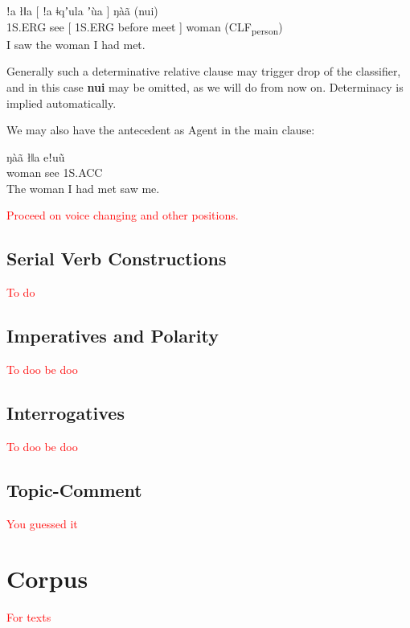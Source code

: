 \documentclass[11pt]{book}
\newcommand{\qcn}[1]{\textbf{#1}}
\newcommand{\grammsc}[1]{\textsc{#1}}
\newcommand{\CLF}[1]{\grammsc{CLF}\textsubscript{#1}}
\newcommand{\ERG}{\grammsc{ERG}}
\newcommand{\ACC}{\grammsc{ACC}}
\newcommand{\cmnt}[1]{\textcolor{red}{#1}}
\begin{document}
\begin{exe}
\ex
\gll ǃa łǁa [ ǃa ǂqʼula ʼùa ] ŋàã (nui) \\
1S.\ERG{} see [ 1S.\ERG{} before meet ] woman (\CLF{person}) \\
\glt I saw the woman I had met.
\end{exe}

Generally such a determinative relative clause may trigger drop of the classifier, and in this case \qcn{nui} may be omitted, as we will do from now on. Determinacy is implied automatically.

We may also have the antecedent as Agent in the main clause:

\begin{exe}
\ex
{} ŋàã łǁa eǃuũ \\
[ 1S.\ERG{} before meet ] woman see 1S.\ACC{} \\
\glt The woman I had met saw me.
\end{exe}

\cmnt{Proceed on voice changing and other positions.}

\section{Serial Verb Constructions}

\cmnt{To do}

\section{Imperatives and Polarity}

\cmnt{To doo be doo}

\section{Interrogatives}

\cmnt{To doo be doo}

\section{Topic-Comment}\label{sec:topiccomment}

\cmnt{You guessed it}

\chapter{Corpus}

\cmnt{For texts}
\end{document}
